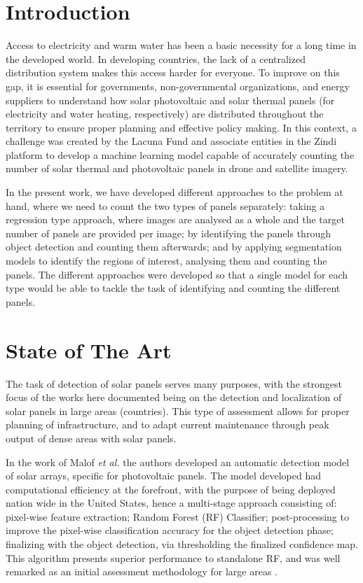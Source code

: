\documentclass[conference]{IEEEtran}
\begin{document}
\section{Introduction}

Access to electricity and warm water has been a basic necessity for a long time in the developed world. In developing countries, the lack of a centralized distribution system makes this access harder for everyone. To improve on this gap, it is essential for governments, non-governmental organizations, and energy suppliers to understand how solar photovoltaic and solar thermal panels (for electricity and water heating, respectively) are distributed throughout the territory to ensure proper planning and effective policy making. In this context, a challenge was created by the Lacuna Fund and associate entities in the Zindi platform to develop a machine learning model capable of accurately counting the number of solar thermal and photovoltaic panels in drone and satellite imagery.

In the present work, we have developed different approaches to the problem at hand, where we need to count the two types of panels separately: taking a regression type approach, where images are analysed as a whole and the target number of panels are provided per image; by identifying the panels through object detection and counting them afterwards; and by applying segmentation models to identify the regions of interest, analysing them and counting the panels. The different approaches were developed so that a single model for each type would be able to tackle the task of identifying and counting the different panels.

\section{State of The Art}

The task of detection of solar panels serves many purposes, with the strongest focus of the works here documented being on the detection and localization of solar panels in large areas (countries). This type of assessment allows for proper planning of infrastructure, and to adapt current maintenance through peak output of dense areas with solar panels.

In the work of Malof \textit{et al.} the authors developed an automatic detection model of solar arrays, specific for photovoltaic panels. The model developed had computational efficiency at the forefront, with the purpose of being deployed nation wide in the United States, hence a multi-stage approach consisting of: pixel-wise feature extraction; Random Forest (RF) Classifier; post-processing to improve the pixel-wise classification accuracy for the object detection phase; finalizing with the object detection, via thresholding the finalized confidence map. This algorithm presents superior performance to standalone RF, and was well remarked as an initial assessment methodology for large areas \cite{Malof_2016}. 
\end{document}
